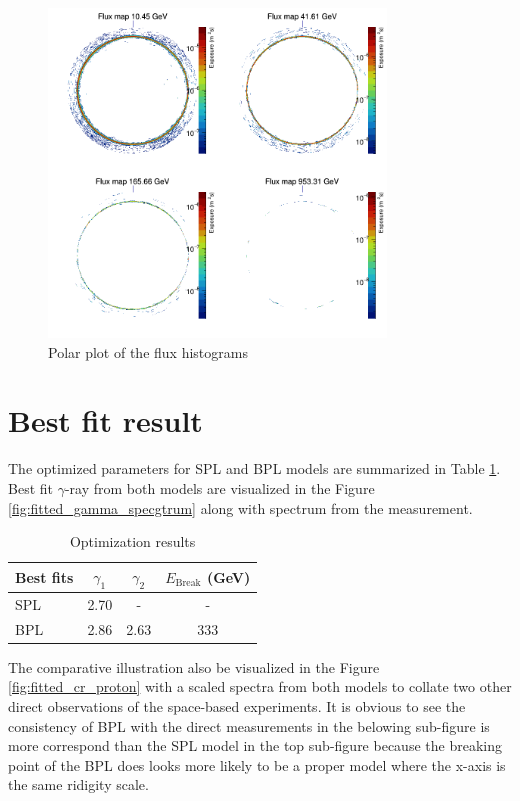 \begin{figure}[h!]
    \centering
    \includegraphics[width=0.8\textwidth]{content/result_and_discussion/figures/polar_flxmaps.png}
    \caption{Polar plot of the flux histograms}
    \label{fig:flxmap_polar}
\end{figure}

\newpage

\section{Best fit result}

The optimized parameters for SPL and BPL models are summarized in 
Table \ref{tb:bestfit}. Best fit $\gamma$-ray from both models are 
visualized in the Figure \ref{fig:fitted_gamma_specgtrum} along
with spectrum from the measurement.

\begin{table}[h!]
    \centering
    \begin{tabular}{l | c | c | c}
      Best fits & $\gamma_1$ & $\gamma_2$ & $E_{\text{Break}}$ (GeV) \\
      \hline \hline
      SPL & 2.70 & - & -  \\
      BPL & 2.86  & 2.63 & 333
    \end{tabular}
    \caption{Optimization results}
    \label{tb:bestfit}
\end{table}

The comparative illustration
also be visualized in the Figure \ref{fig:fitted_cr_proton} with a 
scaled spectra from both models to collate two other direct 
observations of the space-based experiments. It is obvious to see 
the consistency of BPL with the direct measurements in the belowing 
sub-figure is more correspond than the SPL model in the top sub-figure
because the breaking point of the BPL does looks more likely to be 
a proper model where the x-axis is the same ridigity scale.

